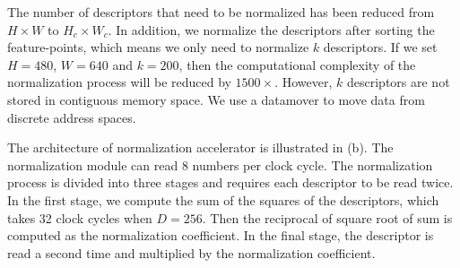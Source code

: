The number of descriptors that need to be normalized has been reduced from $H\times W$ to $H_c\times W_c$. In addition, we normalize the descriptors after sorting the feature-points, which means we only need to normalize $k$ descriptors. If we set $H=480$, $W=640$ and $k=200$, then the computational complexity of the normalization process will be reduced by $1500\times$. However, $k$ descriptors are not stored in contiguous memory space. We use a datamover to move data from discrete address spaces.

The architecture of normalization accelerator is illustrated in (b). The normalization module can read 8 numbers per clock cycle. The normalization process is divided into three stages and requires each descriptor to be read twice. In the first stage, we compute the sum of the squares of the descriptors, which takes 32 clock cycles when $D=256$. Then the reciprocal of square root of sum is computed as the normalization coefficient. In the final stage, the descriptor is read a second time and multiplied by the normalization coefficient.





